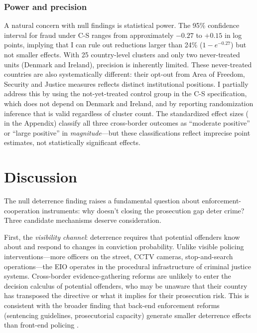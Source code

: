 \documentclass[12pt]{article}
\begin{document}


\subsubsection*{Power and precision}  A natural concern with null findings is statistical power. The 95\% confidence interval for fraud under C-S ranges from approximately $-0.27$ to $+0.15$ in log points, implying that I can rule out reductions larger than 24\% ($1 - e^{-0.27}$) but not smaller effects. With 25 country-level clusters and only two never-treated units (Denmark and Ireland), precision is inherently limited. These never-treated countries are also systematically different: their opt-out from Area of Freedom, Security and Justice measures reflects distinct institutional positions. I partially address this by using the not-yet-treated control group in the C-S specification, which does not depend on Denmark and Ireland, and by reporting randomization inference that is valid regardless of cluster count. The standardized effect sizes ( in the Appendix) classify all three cross-border outcomes as ``moderate positive'' or ``large positive'' in \textit{magnitude}---but these classifications reflect imprecise point estimates, not statistically significant effects.


\section{Discussion}

The null deterrence finding raises a fundamental question about enforcement-cooperation instruments: why doesn't closing the prosecution gap deter crime? Three candidate mechanisms deserve consideration.

First, the \textit{visibility channel}: deterrence requires that potential offenders know about and respond to changes in conviction probability. Unlike visible policing interventions---more officers on the street, CCTV cameras, stop-and-search operations---the EIO operates in the procedural infrastructure of criminal justice systems. Cross-border evidence-gathering reforms are unlikely to enter the decision calculus of potential offenders, who may be unaware that their country has transposed the directive or what it implies for their prosecution risk. This is consistent with the broader finding that back-end enforcement reforms (sentencing guidelines, prosecutorial capacity) generate smaller deterrence effects than front-end policing \citep{chalfin2022criminal}.
\end{document}
